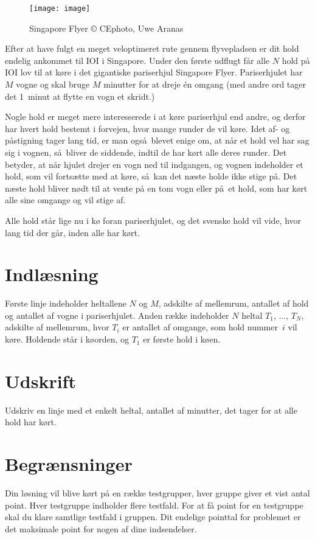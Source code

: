\begin{wrapfigure}{r}{0.3\textwidth}
	\texttt{[image: image]}
	\caption{\centering Singapore Flyer \newline © CEphoto, Uwe Aranas}
\end{wrapfigure}

Efter at have fulgt en meget veloptimeret rute gennem flyvepladsen er dit hold endelig ankommet til IOI i Singapore.
Under den første udflugt får alle $N$ hold på IOI lov til at køre i det gigantiske pariserhjul Singapore Flyer.
Pariserhjulet har $M$ vogne og skal bruge $M$ minutter for at dreje én omgang (med andre ord tager det 1~minut at flytte en vogn et skridt.)

Nogle hold er meget mere interesserede i at køre pariserhjul end andre, og derfor har hvert hold bestemt i forvejen, hvor mange runder de vil køre.
Idet af- og påstigning tager lang tid, er man også blevet enige om, at når et hold vel har sag sig i vognen, så bliver de siddende, indtil de har kørt alle deres runder.
Det betyder, at når hjulet drejer en vogn ned til indgangen, og vognen indeholder et hold, som vil fortsætte med at køre, så kan det næste holde ikke stige på.
Det næste hold bliver nødt til at vente på en tom vogn eller på et hold, som har kørt alle sine omgange og vil stige af.


Alle hold står lige nu i kø foran pariserhjulet, og det svenske hold vil vide, hvor lang tid der går, inden alle har kørt.

\section*{Indlæsning}
Første linje indeholder heltallene $N$ og $M$, adskilte af mellemrum, antallet af hold og antallet af vogne i pariserhjulet.
Anden række indeholder $N$ heltal $T_1$, $\ldots$, $T_N$, adskilte af mellemrum, hvor $T_i$ er antallet af omgange, som hold  nummer~$i$ vil køre.
Holdende står i køorden, og $T_1$ er første hold i køen.

\section*{Udskrift}
Udskriv en linje med et enkelt heltal, antallet af minutter, det tager for at alle hold har kørt.

\section*{Begrænsninger}
Din løsning vil blive kørt på en række testgrupper, hver gruppe giver et vist antal point.
Hver testgruppe indholder flere testfald.
For at få point for en testgruppe skal du klare samtlige testfald i gruppen.
Dit endelige pointtal for problemet er det maksimale point for nogen af dine indsendelser.

